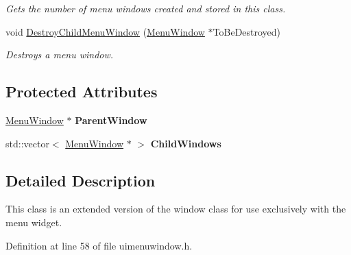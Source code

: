 \begin{DoxyCompactItemize}
\begin{DoxyCompactList}\small\item\em Gets the number of menu windows created and stored in this class. \item\end{DoxyCompactList}\item 
void \hyperlink{classphys_1_1UI_1_1MenuWindow_ace2796c2d250fe1582f7c43333a7295e}{DestroyChildMenuWindow} (\hyperlink{classphys_1_1UI_1_1MenuWindow}{MenuWindow} $\ast$ToBeDestroyed)
\begin{DoxyCompactList}\small\item\em Destroys a menu window. \item\end{DoxyCompactList}\end{DoxyCompactItemize}
\subsection*{Protected Attributes}
\begin{DoxyCompactItemize}
\item 
\hypertarget{classphys_1_1UI_1_1MenuWindow_a94ec8861afbc6f39ac4b443a912bc0c1}{
\hyperlink{classphys_1_1UI_1_1MenuWindow}{MenuWindow} $\ast$ {\bfseries ParentWindow}}
\label{d4/d07/classphys_1_1UI_1_1MenuWindow_a94ec8861afbc6f39ac4b443a912bc0c1}

\item 
\hypertarget{classphys_1_1UI_1_1MenuWindow_a0a644ece010ff27b416c1476f977bb65}{
std::vector$<$ \hyperlink{classphys_1_1UI_1_1MenuWindow}{MenuWindow} $\ast$ $>$ {\bfseries ChildWindows}}
\label{d4/d07/classphys_1_1UI_1_1MenuWindow_a0a644ece010ff27b416c1476f977bb65}

\end{DoxyCompactItemize}


\subsection{Detailed Description}
This class is an extended version of the window class for use exclusively with the menu widget. 

Definition at line 58 of file uimenuwindow.h.



